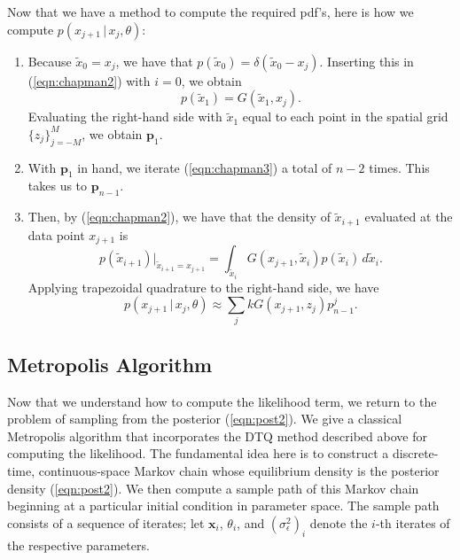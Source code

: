 \documentclass[wcp]{jmlr}
\begin{document}
Now that we have a method to compute the required pdf's, here is how
we compute $p(x_{j+1} \, | \, x_j, \theta)$:
\begin{enumerate}
\item Because $\tilde{x}_0 = x_j$, we have that $p(\tilde{x}_0) =
  \delta(\tilde{x}_0 - x_j)$.  Inserting this in
  (\ref{eqn:chapman2}) with $i=0$, we obtain
\begin{equation}
\label{eqn:DTQfirst}
p(\tilde{x}_1) = G(\tilde{x}_1,x_j).
\end{equation}
Evaluating the right-hand side with $\tilde{x}_1$ equal to each point
in the spatial grid $\{z_j\}_{j=-M}^{M}$, we obtain $\mathbf{p}_1$.
\item With $\mathbf{p}_1$ in hand, we iterate (\ref{eqn:chapman3}) a
  total of $n-2$ times.  This takes us to $\mathbf{p}_{n-1}$.
\item Then, by (\ref{eqn:chapman2}), we have that the density of
  $\tilde{x}_{i+1}$ evaluated at the data point $x_{j+1}$ is
$$
p(\tilde{x}_{i+1}) \biggr|_{\tilde{x}_{i+1} = x_{j+1}} =
\int_{\tilde{x}_i}  G(x_{j+1},\tilde{x}_i)  p(\tilde{x}_i)  \, d
\tilde{x}_i.$$
Applying trapezoidal quadrature to the right-hand side, we have
\begin{equation}
\label{eqn:DTQlast}
p(x_{j+1} \, | \, x_j, \theta) \approx \sum_j k G(x_{j+1},
z_j) p_{n-1}^j.
\end{equation}
\end{enumerate}

\subsection{Metropolis Algorithm}
\label{sect:metropolis}
Now that we understand how to compute the likelihood term, we return
to the problem of sampling from the posterior (\ref{eqn:post2}).  We
give a classical Metropolis algorithm that incorporates the
DTQ method described above for computing the likelihood.  The
fundamental idea here is to construct a discrete-time, continuous-space Markov chain
whose equilibrium density is the posterior density (\ref{eqn:post2}).
We then compute a sample path of this Markov chain beginning at a particular initial
condition in parameter space.  The sample path consists of a sequence
of iterates; let $\mathbf{x}_i$, $\theta_i$, and
$(\sigma_\epsilon^2)_i$ denote the $i$-th iterates of the respective
parameters.
\end{document}
